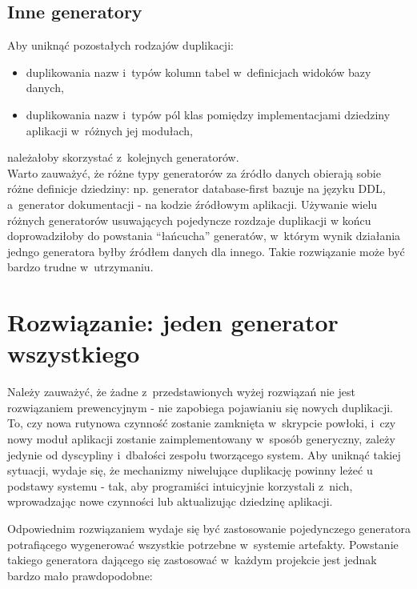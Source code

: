 \subsection{Inne generatory}

Aby uniknąć pozostałych rodzajów duplikacji:

\begin{itemize}
 \item duplikowania nazw i~typów kolumn tabel w~definicjach widoków bazy danych,
 \item duplikowania nazw i~typów pól klas pomiędzy implementacjami dziedziny aplikacji w~różnych jej modułach,
\end{itemize}

należałoby skorzystać z~kolejnych generatorów.\\


Warto zauważyć, że różne typy generatorów za źródło danych obierają sobie różne definicje dziedziny: np. generator database-first bazuje na języku DDL, a~generator dokumentacji - na kodzie źródłowym aplikacji.
Używanie wielu różnych generatorów usuwających pojedyncze rozdzaje duplikacji w końcu doprowadziłoby do powstania ``łańcucha'' generatów, w~którym wynik działania jedngo generatora byłby źródłem danych dla innego.
Takie rozwiązanie może być bardzo trudne w~utrzymaniu.



\section{Rozwiązanie: jeden generator wszystkiego}

Należy zauważyć, że żadne z~przedstawionych wyżej rozwiązań nie jest rozwiązaniem prewencyjnym - nie zapobiega pojawianiu się nowych duplikacji.
To, czy nowa rutynowa czynność zostanie zamknięta w~skrypcie powłoki, i~czy nowy moduł aplikacji zostanie zaimplementowany w~sposób generyczny, zależy jedynie od dyscypliny i~dbałości zespołu tworzącego system.
Aby uniknąć takiej sytuacji, wydaje się, że mechanizmy niwelujące duplikację powinny leżeć u podstawy systemu - tak, aby programiści intuicyjnie korzystali z~nich, wprowadzając nowe czynności lub aktualizując dziedzinę aplikacji.

Odpowiednim rozwiązaniem wydaje się być zastosowanie pojedynczego generatora potrafiącego wygenerować wszystkie potrzebne w~systemie artefakty.
Powstanie takiego generatora dającego się zastosować w~każdym projekcie jest jednak bardzo mało prawdopodobne:

